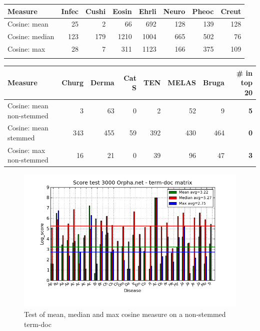 \begin{table}[H]
  \begin{tiny}
  \label{testResult_termDoc_bmj_hist_3000_ns_mea_med_max_nc}
  \begin{tabular}{|l|r|r|r|r|r|r|r|}
    \hline
    Measure &Infec&Cushi&Eosin&Ehrli&Neuro&Pheoc&Creut \\
    \hline
    Cosine: mean & 25 & 2 & 66 & 692 & 128 & 139 & 128 \\
    \hline
    Cosine: median & 123 & 179 & 1210 & 1004 & 665 & 502 & 76 \\
    \hline
    Cosine: max & 28 & 7 & 311 & 1123 & 166 & 375 & 109  \\
    \hline
  \multicolumn{8}{c}{} \\
  \end{tabular}
  \begin{tabular}{|l|r|r|r|r|r|r|r|}
    \hline
    Measure &Churg&Derma&Cat S&TEN&MELAS&Bruga& \scriptsize{\textbf{\# in top 20}} \\
    \hline
    Cosine: mean non-stemmed & 3 & 63 & 0 & 2 & 52 & 9 & \scriptsize{\textbf{5}} \\
    \hline
    Cosine: mean stemmed & 343 & 455 & 59 & 392 & 430 & 464 &  \scriptsize{\textbf{0}}\\
    \hline
    Cosine: max non-stemmed & 16 & 21 & 0 & 39 & 96 & 47 & \scriptsize{\textbf{3}} \\
    \hline
  \end{tabular}
  \end{tiny}
\end{table}

\begin{figure}[H]
  \caption{Test of mean, median and max cosine measure on a non-stemmed term-doc}
  \begin{center}
    \includegraphics[width=1.2\textwidth]{barcharts/termDoc_orphan_hist_3000_ns_mea_med_max_nc.png}
  \end{center}
  \label{termDoc_orphan_hist_3000_ns_mea_med_max_nc}
\end{figure}

